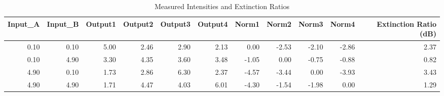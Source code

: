 \begin{table}
\caption{Measured Intensities and Extinction Ratios}
\label{tab:extinction_ratios}
\begin{tabular}{rrrrrrrrrrr}
\toprule
Input_A & Input_B & Output1 & Output2 & Output3 & Output4 & Norm1 & Norm2 & Norm3 & Norm4 & Extinction Ratio (dB) \\
\midrule
0.10 & 0.10 & 5.00 & 2.46 & 2.90 & 2.13 & 0.00 & -2.53 & -2.10 & -2.86 & 2.37 \\
0.10 & 4.90 & 3.30 & 4.35 & 3.60 & 3.48 & -1.05 & 0.00 & -0.75 & -0.88 & 0.82 \\
4.90 & 0.10 & 1.73 & 2.86 & 6.30 & 2.37 & -4.57 & -3.44 & 0.00 & -3.93 & 3.43 \\
4.90 & 4.90 & 1.71 & 4.47 & 4.03 & 6.01 & -4.30 & -1.54 & -1.98 & 0.00 & 1.29 \\
\bottomrule
\end{tabular}
\end{table}
